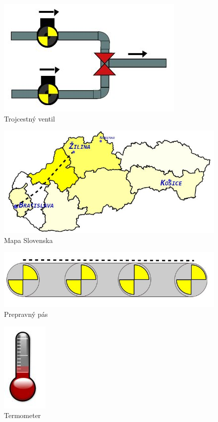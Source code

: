 \begin{figure}[H]
	\centering
	\includegraphics[width=0.7\linewidth]{obrazky/trippleValve}
	\caption{Trojcestný ventil}
	\label{fig:trippleValve}
\end{figure}
\begin{figure}[H]
	\centering
	\includegraphics[width=0.7\linewidth]{obrazky/map}
	\caption{Mapa Slovenska}
	\label{fig:map}
\end{figure}


\begin{figure}[H]
	\centering
	\includegraphics[width=0.7\linewidth]{obrazky/belt}
	\caption{Prepravný pás}
	\label{fig:belt}
\end{figure}
\begin{figure}[H]
	\centering
	\includegraphics{obrazky/thermometer}
	\caption{Termometer}
	\label{fig:thermometer}
\end{figure}

